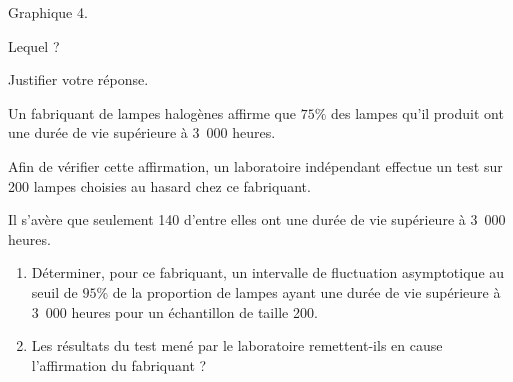 \begin{enumerate}
     \begin{center}
          Graphique 4.
     \end{center}
     \par
     Lequel ?
     \par
     Justifier votre réponse.
     \par
\end{enumerate}
\par
%
%
\par
Un fabriquant de lampes halogènes affirme que $75\%$ des lampes qu'il produit ont une durée de vie supérieure à 3\ 000 heures.
\par
Afin de vérifier cette affirmation, un laboratoire indépendant effectue un test sur 200 lampes choisies au hasard chez ce fabriquant.
\par
Il s'avère que seulement 140 d'entre elles ont une  durée de vie supérieure à 3\ 000 heures.
\par
\begin{enumerate}
     \item
     Déterminer, pour ce fabriquant, un intervalle de fluctuation asymptotique au seuil de $95\%$ de la proportion de lampes ayant une durée de vie supérieure à 3\ 000 heures pour un échantillon de taille 200.
     \item
     Les résultats du test mené par le laboratoire remettent-ils en cause l'affirmation du fabriquant ?
     \par
\end{enumerate}
